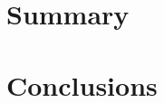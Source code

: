 \documentclass[english, 12pt, a4paper, sci, utf8, a-1b, online]{aaltothesis}
\begin{document}
%
%
%
%
%
%

\clearpage
\section{Summary}

\clearpage
\section{Conclusions}

\clearpage
\thesisbibliography


\clearpage
\thesisappendix
\end{document}
